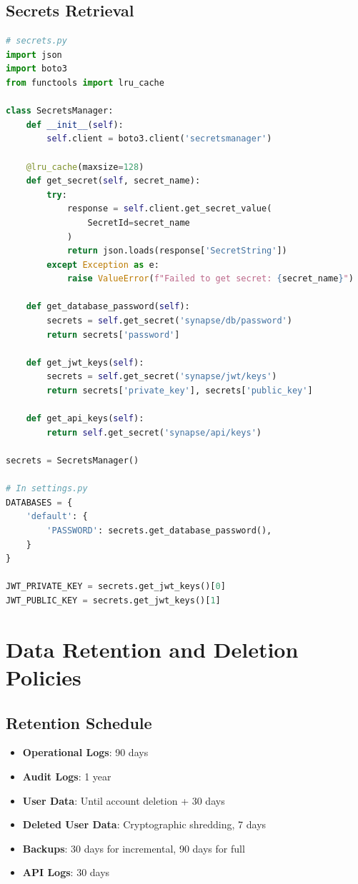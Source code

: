 \documentclass{report}
\begin{document}
\subsection{Secrets Retrieval}
\begin{lstlisting}[language=Python]
# secrets.py
import json
import boto3
from functools import lru_cache

class SecretsManager:
    def __init__(self):
        self.client = boto3.client('secretsmanager')
    
    @lru_cache(maxsize=128)
    def get_secret(self, secret_name):
        try:
            response = self.client.get_secret_value(
                SecretId=secret_name
            )
            return json.loads(response['SecretString'])
        except Exception as e:
            raise ValueError(f"Failed to get secret: {secret_name}")
    
    def get_database_password(self):
        secrets = self.get_secret('synapse/db/password')
        return secrets['password']
    
    def get_jwt_keys(self):
        secrets = self.get_secret('synapse/jwt/keys')
        return secrets['private_key'], secrets['public_key']
    
    def get_api_keys(self):
        return self.get_secret('synapse/api/keys')

secrets = SecretsManager()

# In settings.py
DATABASES = {
    'default': {
        'PASSWORD': secrets.get_database_password(),
    }
}

JWT_PRIVATE_KEY = secrets.get_jwt_keys()[0]
JWT_PUBLIC_KEY = secrets.get_jwt_keys()[1]
\end{lstlisting}

\section{Data Retention and Deletion Policies}

\subsection{Retention Schedule}
\begin{itemize}
\item \textbf{Operational Logs}: 90 days
\item \textbf{Audit Logs}: 1 year
\item \textbf{User Data}: Until account deletion + 30 days
\item \textbf{Deleted User Data}: Cryptographic shredding, 7 days
\item \textbf{Backups}: 30 days for incremental, 90 days for full
\item \textbf{API Logs}: 30 days
\end{itemize}
\end{document}
